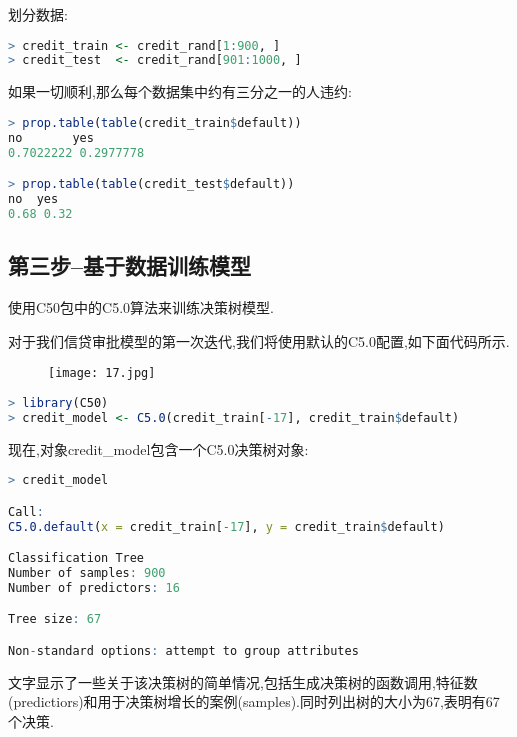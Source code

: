 \documentclass[11pt,a4paper,oneside]{book}
\begin{document}
划分数据:
\begin{lstlisting}[language=r]
> credit_train <- credit_rand[1:900, ]
> credit_test  <- credit_rand[901:1000, ]	
\end{lstlisting}

如果一切顺利,那么每个数据集中约有三分之一的人违约:
\begin{lstlisting}[language=r]
> prop.table(table(credit_train$default))
no       yes 
0.7022222 0.2977778 

> prop.table(table(credit_test$default))
no  yes 
0.68 0.32 
\end{lstlisting}
\subsection{第三步--基于数据训练模型}
使用C50包中的C5.0算法来训练决策树模型.

对于我们信贷审批模型的第一次迭代,我们将使用默认的C5.0配置,如下面代码所示.
\begin{figure}[H]
	\centering
	\texttt{[image: 17.jpg]}
\end{figure}
\begin{lstlisting}[language=r]
> library(C50)
> credit_model <- C5.0(credit_train[-17], credit_train$default)
\end{lstlisting}
现在,对象credit\_model包含一个C5.0决策树对象:
\begin{lstlisting}[language=r]
> credit_model

Call:
C5.0.default(x = credit_train[-17], y = credit_train$default)

Classification Tree
Number of samples: 900 
Number of predictors: 16 

Tree size: 67 

Non-standard options: attempt to group attributes
\end{lstlisting}
文字显示了一些关于该决策树的简单情况,包括生成决策树的函数调用,特征数(predictiors)和用于决策树增长的案例(samples).同时列出树的大小为67,表明有67个决策.
\end{document}

